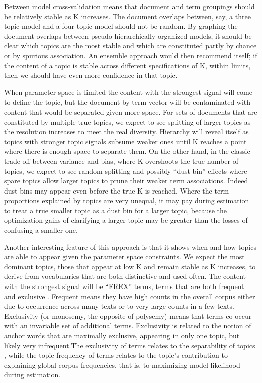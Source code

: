 \documentclass[]{book}
\theoremstyle{definition}
\theoremstyle{definition}
\theoremstyle{definition}
\theoremstyle{remark}
\begin{document}
Between model cross-validation means that document and term groupings
should be relatively stable as K increases. The document overlaps
between, say, a three topic model and a four topic model should not be
random. By graphing the document overlaps between pseudo hierarchically
organized models, it should be clear which topics are the most stable
and which are constituted partly by chance or by spurious association.
An ensemble approach would then recommend itself; if the content of a
topic is stable across different specifications of K, within limits,
then we should have even more confidence in that topic.

When parameter space is limited the content with the strongest signal
will come to define the topic, but the document by term vector will be
contaminated with content that would be separated given more space. For
sets of documents that are constituted by multiple true topics, we
expect to see splitting of larger topics as the resolution increases to
meet the real diversity. Hierarchy will reveal itself as topics with
stronger topic signals subsume weaker ones until K reaches a point where
there is enough space to separate them. On the other hand, in the
classic trade-off between variance and bias, where K overshoots the true
number of topics, we expect to see random splitting and possibly ``dust
bin'' effects where spare topics allow larger topics to prune their
weaker term associations. Indeed dust bins may appear even before the
true K is reached. Where the term proportions explained by topics are
very unequal, it may pay during estimation to treat a true smaller topic
as a dust bin for a larger topic, because the optimization gains of
clarifying a larger topic may be greater than the losses of confusing a
smaller one.

Another interesting feature of this approach is that it shows when and
how topics are able to appear given the parameter space constraints. We
expect the most dominant topics, those that appear at low K and remain
stable as K increases, to derive from vocabularies that are both
distinctive and used often. The content with the strongest signal will
be ``FREX'' terms, terms that are both frequent and exclusive
\citep{Bischof2012Summarizing}. Frequent means they have high counts in
the overall corpus either due to occurrence across many texts or to very
large counts in a few texts. Exclusivity (or monosemy, the opposite of
polysemy) means that terms co-occur with an invariable set of additional
terms. Exclusivity is related to the notion of anchor words that are
maximally exclusive, appearing in only one topic, but likely very
infrequent.The exclusivity of terms relates to the separability of
topics \citep{Arora2018Learning}, while the topic frequency of terms
relates to the topic's contribution to explaining global corpus
frequencies, that is, to maximizing model likelihood during estimation.
\end{document}
